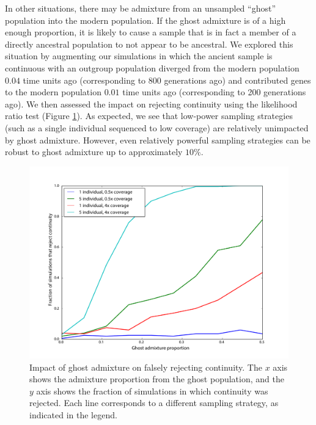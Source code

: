 \documentclass[11pt, oneside]{article}   	%
\begin{document}
In other situations, there may be admixture from an unsampled ``ghost'' population into the modern population. If the ghost admixture is of a high enough proportion, it is likely to cause a sample that is in fact a member of a directly ancestral population to not appear to be ancestral. We explored this situation by augmenting our simulations in which the ancient sample is continuous with an outgroup population diverged from the modern population $0.04$ time units ago (corresponding to 800 generations ago) and contributed genes to the modern population $0.01$ time units ago (corresponding to 200 generations ago). We then assessed the impact on rejecting continuity using the likelihood ratio test (Figure \ref{ghost}). As expected, we see that low-power sampling strategies (such as a single individual sequenced to low coverage) are relatively unimpacted by ghost admixture. However, even relatively powerful sampling strategies can be robust to ghost admixture up to approximately $10\%$.  

\begin{figure}[h] %
   \centering
   \includegraphics[width=\textwidth]{continuity_rejection_ghost.pdf} 
   \caption{Impact of ghost admixture on falsely rejecting continuity. The $x$ axis shows the admixture proportion from the ghost population, and the $y$ axis shows the fraction of simulations in which continuity was rejected. Each line corresponds to a different sampling strategy, as indicated in the legend.}
   \label{ghost}
\end{figure}
\end{document}
